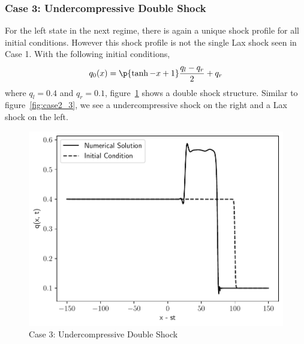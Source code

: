 \subsubsection{Case 3: Undercompressive Double Shock}\label{sssec:case3}
For the left state in the next regime, there is again a unique shock profile for all
initial conditions.
However this shock profile is not the single Lax shock seen in Case 1.
With the following initial conditions,
\begin{equation}
  q_0(x) = \p{\tanh{-x} + 1} \frac{q_l - q_r}{2} + q_r
\end{equation}
where \(q_l = 0.4\) and \(q_r = 0.1\), figure~\ref{fig:case3} shows a double shock
structure.
Similar to figure~\ref{fig:case2_3}, we see a undercompressive shock on the right
and a Lax shock on the left.
\begin{figure}
  \centering
  \includegraphics[scale=0.5]{figures/case_3_1.pdf}
  \caption{Case 3: Undercompressive Double Shock}\label{fig:case3}
\end{figure}

